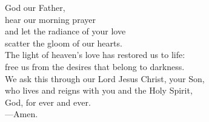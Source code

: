 \prayer


\begin{prayerverse}
God our Father,\\
hear our morning prayer\\
and let the radiance of your love\\
scatter the gloom of our hearts.\\
The light of heaven’s love has restored us to life:\\
free us from the desires that belong to darkness.\\
We ask this through our Lord Jesus Christ, your Son,\\
who lives and reigns with you and the Holy Spirit,\\
God, for ever and ever.\\
{\color{red}---\thinspace}Amen.
\end{prayerverse}


